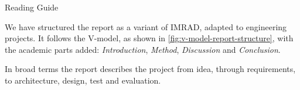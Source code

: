 \clearpage
{\hspace{-5.5mm}\Huge Reading Guide}

We have structured the report as a variant of IMRAD, adapted to engineering
projects. It follows the V-model, as shown in
\autoref{fig:v-model-report-structure}, with the academic parts added:
\textit{Introduction}, \textit{Method}, \textit{Discussion} and
\textit{Conclusion}.


In broad terms the report describes the project from idea, through
requirements, to architecture, design, test and evaluation.

